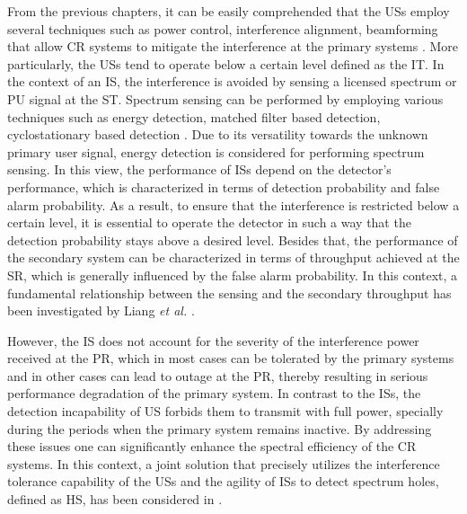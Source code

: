From the previous chapters, it can be easily comprehended that the USs employ several techniques such as power control, interference alignment, beamforming that allow CR systems to mitigate the interference at the primary systems \cite{Sharma15}. More particularly, the USs tend to operate below a certain level defined as the IT. 
In the context of an IS, the interference is avoided by sensing a licensed spectrum or PU signal at the ST.
Spectrum sensing can be performed by employing various techniques such as energy detection, matched filter based detection, cyclostationary based detection \cite{Axell12}. Due to its versatility towards the unknown primary user signal, energy detection is considered for performing spectrum sensing. In this view, the performance of ISs depend on the detector's performance, which is characterized in terms of detection probability and false alarm probability. 
As a result, to ensure that the interference is restricted below a certain level, it is essential to operate the detector in such a way that the detection probability stays above a desired level. Besides that, the performance of the secondary system can be characterized in terms of throughput achieved at the SR, which is generally influenced by the false alarm probability. In this context, a fundamental relationship between the sensing and the secondary throughput has been investigated by Liang \textit{et al.} \cite{Liang08}. 

However, the IS does not account for the severity of the interference power received at the PR, which in most cases can be tolerated by the primary systems and in other cases can lead to outage at the PR, thereby resulting in serious performance degradation of the primary system. In contrast to the ISs, the detection incapability of US forbids them to transmit with full power, specially during the periods when the primary system remains inactive. By addressing these issues one can significantly enhance the spectral efficiency of the CR systems. In this context, a joint solution that precisely utilizes the interference tolerance capability of the USs and the agility of ISs to detect spectrum holes, defined as HS, has been considered in \cite{Kang09,Oh10,Senthu12,Song13,Gmira15,Jiang13,Fili15,Sharma14}. 


